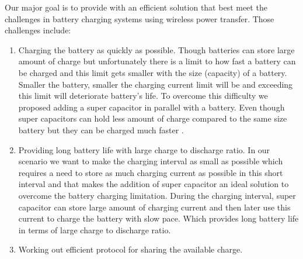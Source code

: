 Our major goal is to provide with an efficient solution that best meet the challenges in battery charging systems using wireless power transfer.
Those challenges include:
\begin{enumerate}
\item Charging the battery as quickly as possible. 
Though batteries can store large amount of charge but unfortunately there is a limit to how fast a battery can be charged and this limit gets smaller with the size (capacity) of a battery. Smaller the battery, smaller the charging current limit will be and exceeding this limit will deteriorate battery's life. To overcome this difficulty we proposed adding a super capacitor in parallel with a battery. Even though super capacitors can hold less amount of charge compared to the same size battery but they can be charged much faster \cite{IAmp}.
\item Providing long battery life with large charge to discharge ratio.
In our scenario we want to make the charging interval as small as possible which requires a need to store as much charging current as possible in this short interval and that makes the addition of super capacitor an ideal solution to overcome the battery charging limitation. During the charging interval, super capacitor can store large amount of charging current and then later use this current to charge the battery with slow pace. Which provides long battery life in terms of large charge to discharge ratio.
 
\item Working out efficient protocol for sharing the available charge.

\end{enumerate}
